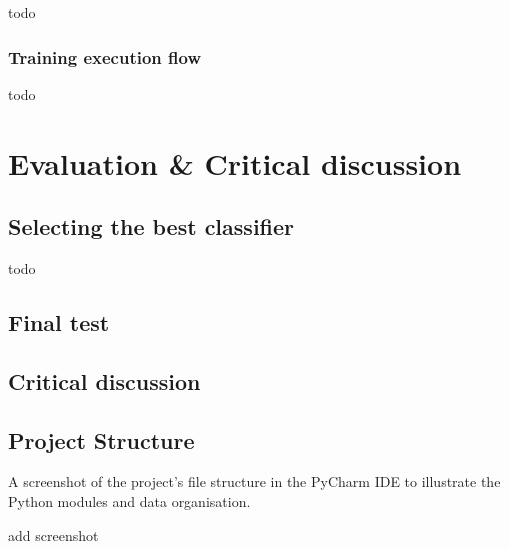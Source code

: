 \documentclass[letterpaper,12pt]{article}
\begin{document}
todo

\subsubsection{Training  execution flow}

todo


\section{Evaluation \& Critical discussion}
\label{sec:evaluation}

\subsection{Selecting the best classifier}

todo

\subsection{Final test}


\subsection{Critical discussion}



\begin{appendices}

\clearpage





\clearpage
\section{Project Structure}
\label{sec:appendix-project-structure}

A screenshot of the project's file structure in the PyCharm IDE to illustrate the Python modules and data organisation.

add screenshot


\end{appendices}
\end{document}
